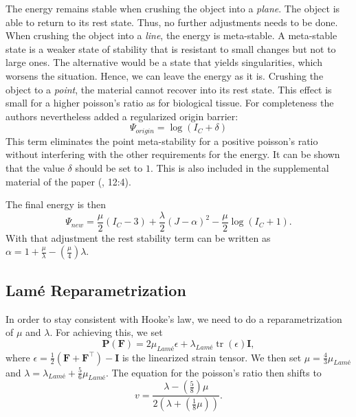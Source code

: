 The energy remains stable when crushing the object into a \textit{plane}. The object is able to return to its rest state. Thus, no further adjustments needs to be done. When crushing the object into a \textit{line}, the energy is meta-stable. A meta-stable state is a weaker state of stability that is resistant to small changes but not to large ones. The alternative would be a state that yields singularities, which worsens the situation. Hence, we can leave the energy as it is. Crushing the object to a \textit{point}, the material cannot recover into its rest state. This effect is small for a higher poisson's ratio as for biological tissue. For completeness the authors nevertheless added a regularized origin barrier:
\[
	\Psi_{origin} = \operatorname{log}(I_C +\delta)
\]
This term eliminates the point meta-stability for a positive poisson's ratio without interfering with the other requirements for the energy. It can be shown that the value $\delta$ should be set to $1$. This is also included in the supplemental material of the paper (\cite{Smith:2018:SNF:3191713.3180491}, 12:4).

The final energy is then
\begin{equation}\label{eq:stable_energy}
\Psi_{new} = \frac{\mu}{2}\left(I_{C}-3\right) + \frac{\lambda}{2}(J-\alpha)^{2} - \frac{\mu}{2} \operatorname{log}\left(I_{C}+1\right).
\end{equation}
With that adjustment the rest stability term can be written as $\alpha=1+\frac{\mu}{\lambda}-\left(\frac{\mu}{4}\right)\lambda$.

\subsection{Lamé Reparametrization}
In order to stay consistent with Hooke's law, we need to do a reparametrization of $\mu$ and $\lambda$. For achieving this, we set
\begin{equation}
	\mathbf{P}(\mathbf{F}) = 2 \mu_{Lamé} \epsilon + \lambda_{Lamé} \operatorname{tr}(\epsilon) \mathbf{I},
\end{equation}
where $\epsilon = \frac{1}{2} (\mathbf{F} + \mathbf{F}^\intercal) - \mathbf{I}$ is the linearized strain tensor. We then set $\mu = \frac{4}{3} \mu_{Lamé}$ and $\lambda = \lambda_{Lamé} + \frac{5}{6} \mu_{Lamé}$. The equation for the poisson's ratio then shifts to 
\[
	v= \frac{\lambda - \left( \frac{5}{8} \right) \mu}{2 \left(\lambda + \left( \frac{1}{8} \mu \right) \right)}.
\]



